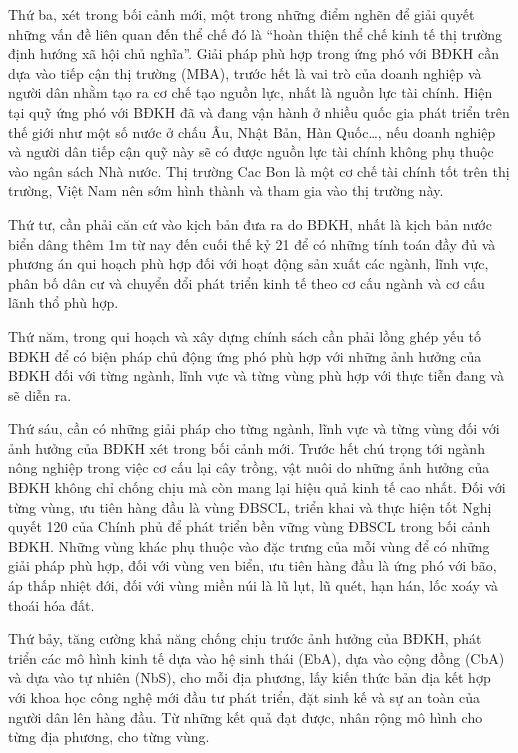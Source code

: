 \begin{enumerate}[label=\bfseries Câu \arabic*:]
{		Thứ ba, xét trong bối cảnh mới, một trong những điểm nghẽn để giải quyết những vấn đề liên quan đến thể chế đó là “hoàn thiện thể chế kinh tế thị trường định hướng xã hội chủ nghĩa”. Giải pháp phù hợp trong ứng phó với BĐKH cần dựa vào tiếp cận thị trường (MBA), trước hết là vai trò của doanh nghiệp và người dân nhằm tạo ra cơ chế tạo nguồn lực, nhất là nguồn lực tài chính. Hiện tại quỹ ứng phó với BĐKH đã và đang vận hành ở nhiều quốc gia phát triển trên thế giới như một số nước ở chấu Âu, Nhật Bản, Hàn Quốc…, nếu doanh nghiệp và người dân tiếp cận quỹ này sẽ có được nguồn lực tài chính không phụ thuộc vào ngân sách Nhà nước. Thị trường Cac Bon là một cơ chế tài chính tốt trên thị trường, Việt Nam nên sớm hình thành và tham gia vào thị trường này.
		
		Thứ tư, cần phải căn cứ vào kịch bản đưa ra do BĐKH, nhất là kịch bản nước biển dâng thêm 1m từ nay đến cuối thế kỷ 21 để có những tính toán đầy đủ và phương án qui hoạch phù hợp đối với hoạt động sản xuất các ngành, lĩnh vực, phân bố dân cư và chuyển đổi phát triển kinh tế theo cơ cấu ngành và cơ cấu lãnh thổ phù hợp.
		
		Thứ năm, trong qui hoạch và xây dựng chính sách cần phải lồng ghép yếu tố BĐKH để có biện pháp chủ động ứng phó phù hợp với những ảnh hưởng của BĐKH đối với từng ngành, lĩnh vực và từng vùng phù hợp với thực tiễn đang và sẽ diễn ra.
		
		Thứ sáu, cần có những giải pháp cho từng ngành, lĩnh vực và từng vùng đối với ảnh hưởng của BĐKH xét trong bối cảnh mới. Trước hết chú trọng tới ngành nông nghiệp trong việc cơ cấu lại cây trồng, vật nuôi do những ảnh hưởng của BĐKH không chỉ chống chịu mà còn mang lại hiệu quả kinh tế cao nhất. Đối với từng vùng, ưu tiên hàng đầu là vùng ĐBSCL, triển khai và thực hiện tốt Nghị quyết 120 của Chính phủ để phát triển bền vững vùng ĐBSCL trong bối cảnh BĐKH. Những vùng khác phụ thuộc vào đặc trưng của mỗi vùng để có những giải pháp phù hợp, đối với vùng ven biển, ưu tiên hàng đầu là ứng phó với bão, áp thấp nhiệt đới, đối với vùng miền núi là lũ lụt, lũ quét, hạn hán, lốc xoáy và thoái hóa đất.
		
		Thứ bảy, tăng cường khả năng chống chịu trước ảnh hưởng của BĐKH, phát triển các mô hình kinh tế dựa vào hệ sinh thái (EbA),  dựa vào cộng đồng (CbA) và dựa vào tự nhiên (NbS), cho mỗi địa phương, lấy kiến thức bản địa kết hợp với khoa học công nghệ mới đầu tư phát triển, đặt sinh kế và sự an toàn của người dân lên hàng đầu. Từ những kết quả đạt được, nhân rộng mô hình cho từng địa phương, cho từng vùng.
		
}
\end{enumerate}
